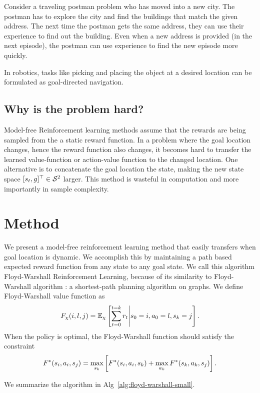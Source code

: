 Consider a traveling postman problem who has moved into a new city. The postman has
to explore the city and find the buildings that match the given address.
The next time the postman gets the same address, they can use their experience to find out the building.
Even when a new address is provided (in the next episode), the postman can use
experience to find the new episode more quickly.

In robotics, tasks like picking and placing the object at a desired location can be
formulated as goal-directed navigation.

\subsection{Why is the problem hard?}
Model-free Reinforcement learning methods assume that the rewards are being sampled
from the a static reward function.
In a problem where the goal location changes, hence the reward function also changes,
it becomes hard to transfer the learned value-function or action-value function to
the changed location.
One alternative is to concatenate the goal location the state, making the new state space
$[s_t, g]^\top \in \mathcal{S}^2$ larger.
This method is wasteful in computation and more importantly in sample complexity.

\section{Method}
We present a model-free reinforcement learning method that easily transfers when goal
location is dynamic.
We accomplish this by maintaining a path based expected reward function from any state to any goal state.
We call this algorithm Floyd-Warshall Reinforcement Learning, because of its
similarity to Floyd-Warshall algorithm : a shortest-path planning algorithm on graphs.
We define Floyd-Warshall value function as
%
\begin{align}
F_{\chi}(i, l,  j) =
\mathbb{E}_{\chi}\left[ \sum_{t=0}^{t=k} r_t \middle\vert s_0 = i, a_0 = l, s_k = j \right] .
\end{align}%
%
When the policy is optimal, the Floyd-Warshall function should satisfy the constraint
%
\begin{align}
F^*(s_i, a_i, s_j) = \max_{s_k} \left[
F^*(s_i, a_i, s_k)
+ \max_{a_k}F^*(s_k, a_k, s_j) \right] .
\end{align}%
%

We summarize the algorithm in Alg~\ref{alg:floyd-warshall-small}.



